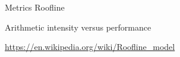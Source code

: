 %
\begin{Frame}{Metrics Roofline}
  \begin{block}{Arithmetic intensity versus performance}
  \end{block}   
\url{https://en.wikipedia.org/wiki/Roofline_model}
\end{Frame}


